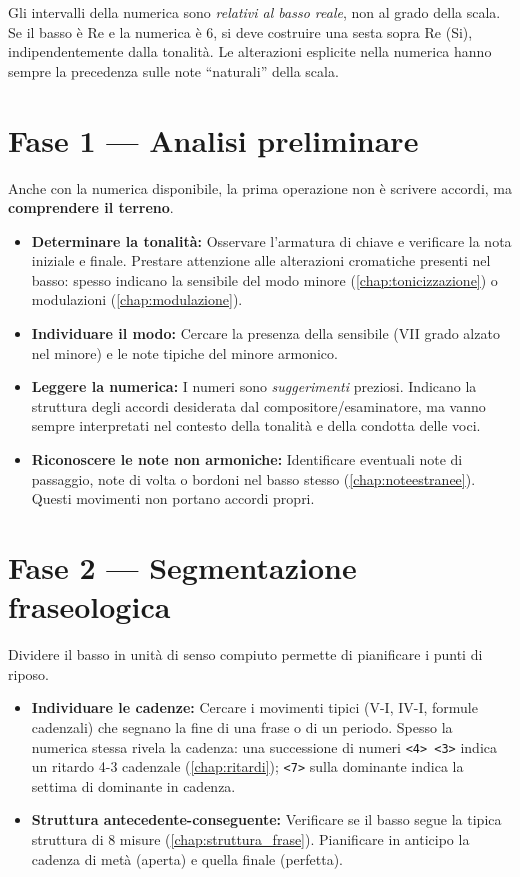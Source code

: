 \begin{osservazione}
	\label{oss:numerica_relativa}
	Gli intervalli della numerica sono \textit{relativi al basso reale}, non al grado della scala. Se il basso è Re e la numerica è 6, si deve costruire una sesta sopra Re (Si), indipendentemente dalla tonalità. Le alterazioni esplicite nella numerica hanno sempre la precedenza sulle note ``naturali'' della scala.
\end{osservazione}

\section{Fase 1 — Analisi preliminare}
\label{sec:fase1_numerato}

Anche con la numerica disponibile, la prima operazione non è scrivere accordi, ma \textbf{comprendere il terreno}.

\begin{itemize}
	\item \textbf{Determinare la tonalità:} Osservare l'armatura di chiave e verificare la nota iniziale e finale. Prestare attenzione alle alterazioni cromatiche presenti nel basso: spesso indicano la sensibile del modo minore (\ref{chap:tonicizzazione}) o modulazioni (\ref{chap:modulazione}).
	\item \textbf{Individuare il modo:} Cercare la presenza della sensibile (VII grado alzato nel minore) e le note tipiche del minore armonico.
	\item \textbf{Leggere la numerica:} I numeri sono \textit{suggerimenti} preziosi. Indicano la struttura degli accordi desiderata dal compositore/esaminatore, ma vanno sempre interpretati nel contesto della tonalità e della condotta delle voci.
	\item \textbf{Riconoscere le note non armoniche:} Identificare eventuali note di passaggio, note di volta o bordoni nel basso stesso (\ref{chap:noteestranee}). Questi movimenti non portano accordi propri.
\end{itemize}

\section{Fase 2 — Segmentazione fraseologica}
\label{sec:fase2_numerato}

Dividere il basso in unità di senso compiuto permette di pianificare i punti di riposo.

\begin{itemize}
	\item \textbf{Individuare le cadenze:} Cercare i movimenti tipici (V-I, IV-I, formule cadenzali) che segnano la fine di una frase o di un periodo. Spesso la numerica stessa rivela la cadenza: una successione di numeri \texttt{<4> <3>} indica un ritardo 4-3 cadenzale (\ref{chap:ritardi}); \texttt{<7>} sulla dominante indica la settima di dominante in cadenza.
	\item \textbf{Struttura antecedente-conseguente:} Verificare se il basso segue la tipica struttura di 8 misure (\ref{chap:struttura_frase}). Pianificare in anticipo la cadenza di metà (aperta) e quella finale (perfetta).
\end{itemize}

